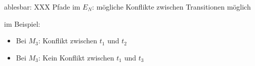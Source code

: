 \begin{figure}[H]
	\centering
	\qquad 
\end{figure}

ablesbar: XXX Pfade im $E_N$: mögliche Konflikte zwischen Transitionen möglich 

im Beispiel:
\begin{itemize}
	\item Bei $M_3$: Konflikt zwischen $t_1$ und $t_2$
	\item Bei $M_3$: Kein Konflikt zwischen $t_1$ und $t_3$
\end{itemize}










